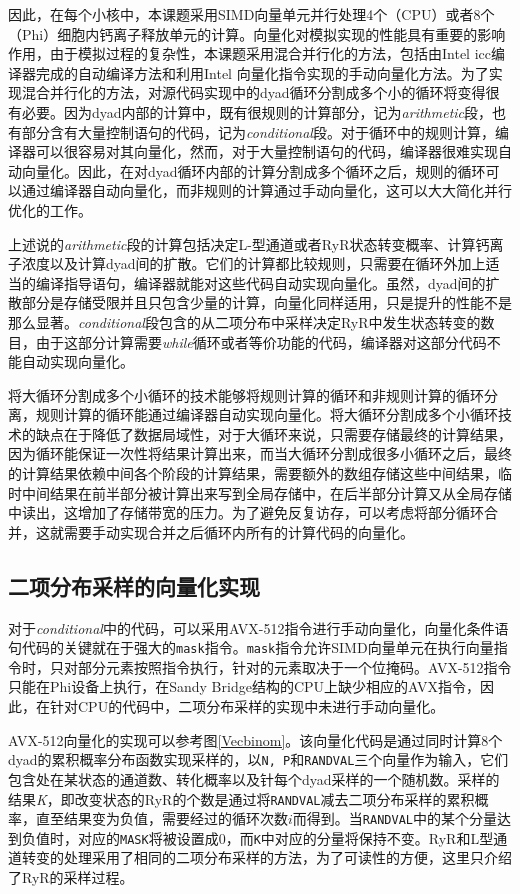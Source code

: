因此，在每个小核中，本课题采用SIMD向量单元并行处理4个（CPU）或者8个（Phi）细胞内钙离子释放单元的计算。向量化对模拟实现的性能具有重要的影响作用，由于模拟过程的复杂性，本课题采用混合并行化的方法，包括由Intel icc编译器完成的自动编译方法和利用Intel 向量化指令实现的手动向量化方法。为了实现混合并行化的方法，对源代码实现中的dyad循环分割成多个小的循环将变得很有必要。因为dyad内部的计算中，既有很规则的计算部分，记为\textit{arithmetic}段，也有部分含有大量控制语句的代码，记为\textit{conditional}段。对于循环中的规则计算，编译器可以很容易对其向量化，然而，对于大量控制语句的代码，编译器很难实现自动向量化。因此，在对dyad循环内部的计算分割成多个循环之后，规则的循环可以通过编译器自动向量化，而非规则的计算通过手动向量化，这可以大大简化并行优化的工作。

上述说的\textit{arithmetic}段的计算包括决定L-型通道或者RyR状态转变概率、计算钙离子浓度以及计算dyad间的扩散。它们的计算都比较规则，只需要在循环外加上适当的编译指导语句，编译器就能对这些代码自动实现向量化。虽然，dyad间的扩散部分是存储受限并且只包含少量的计算，向量化同样适用，只是提升的性能不是那么显著。\textit{conditional}段包含的从二项分布中采样决定RyR中发生状态转变的数目，由于这部分计算需要{\it while}循环或者等价功能的代码，编译器对这部分代码不能自动实现向量化。

将大循环分割成多个小循环的技术能够将规则计算的循环和非规则计算的循环分离，规则计算的循环能通过编译器自动实现向量化。将大循环分割成多个小循环技术的缺点在于降低了数据局域性，对于大循环来说，只需要存储最终的计算结果，因为循环能保证一次性将结果计算出来，而当大循环分割成很多小循环之后，最终的计算结果依赖中间各个阶段的计算结果，需要额外的数组存储这些中间结果，临时中间结果在前半部分被计算出来写到全局存储中，在后半部分计算又从全局存储中读出，这增加了存储带宽的压力。为了避免反复访存，可以考虑将部分循环合并，这就需要手动实现合并之后循环内所有的计算代码的向量化。

\subsection{二项分布采样的向量化实现}
对于\textit{conditional}中的代码，可以采用AVX-512指令进行手动向量化，向量化条件语句代码的关键就在于强大的\texttt{mask}指令。\texttt{mask}指令允许SIMD向量单元在执行向量指令时，只对部分元素按照指令执行，针对的元素取决于一个位掩码。AVX-512指令只能在Phi设备上执行，在Sandy Bridge结构的CPU上缺少相应的AVX指令，因此，在针对CPU的代码中，二项分布采样的实现中未进行手动向量化。

AVX-512向量化的实现可以参考图\ref{Vecbinom}。该向量化代码是通过同时计算8个dyad的累积概率分布函数实现采样的，以{\tt N, P}和{\tt RANDVAL}三个向量作为输入，它们包含处在某状态的通道数、转化概率以及针每个dyad采样的一个随机数。采样的结果{\it K}，即改变状态的RyR的个数是通过将{\tt RANDVAL}减去二项分布采样的累积概率，直至结果变为负值，需要经过的循环次数$i$而得到。当{\tt RANDVAL}中的某个分量达到负值时，对应的{\tt MASK}将被设置成$0$，而{\tt K}中对应的分量将保持不变。RyR和L型通道转变的处理采用了相同的二项分布采样的方法，为了可读性的方便，这里只介绍了RyR的采样过程。

